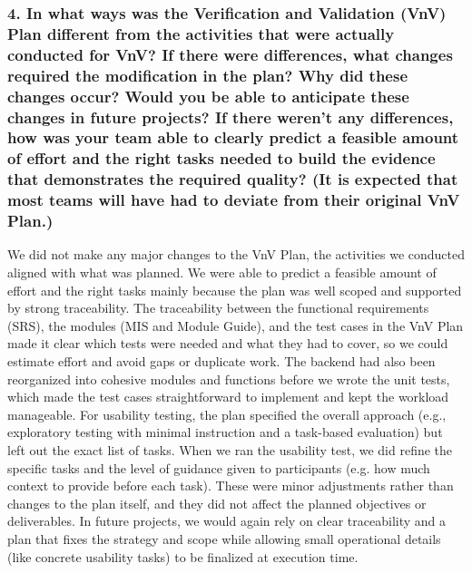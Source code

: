 \documentclass[12pt, titlepage]{article}
\begin{document}
\subsubsection*{4. In what ways was the Verification and Validation (VnV) Plan different from the activities that were actually conducted for VnV?  If there were 
differences, what changes required the modification in the plan?  Why did these changes occur?  Would you be able to anticipate these changes in future 
projects?  If there weren't any differences, how was your team able to clearly predict a feasible amount of effort and the right tasks needed to build the 
evidence that demonstrates the required quality?  (It is expected that most teams will have had to deviate from their original VnV Plan.)}
We did not make any major changes to the VnV Plan, the activities we conducted aligned with what was planned. We were able to predict a feasible amount of effort and the right tasks mainly because the plan was well scoped and supported by strong traceability. The traceability between the functional requirements (SRS), the modules (MIS and Module Guide), and the test cases in the VnV Plan made it clear which tests were needed and what they had to cover, so we could estimate effort and avoid gaps or duplicate work. The backend had also been reorganized into cohesive modules and functions before we wrote the unit tests, which made the test cases straightforward to implement and kept the workload manageable. For usability testing, the plan specified the overall approach (e.g., exploratory testing with minimal instruction and a task-based evaluation) but left out the exact list of tasks. When we ran the usability test, we did refine the specific tasks and the level of guidance given to participants (e.g. how much context to provide before each task). These were minor adjustments rather than changes to the plan itself, and they did not affect the planned objectives or deliverables. In future projects, we would again rely on clear traceability and a plan that fixes the strategy and scope while allowing small operational details (like concrete usability tasks) to be finalized at execution time.
\end{document}
